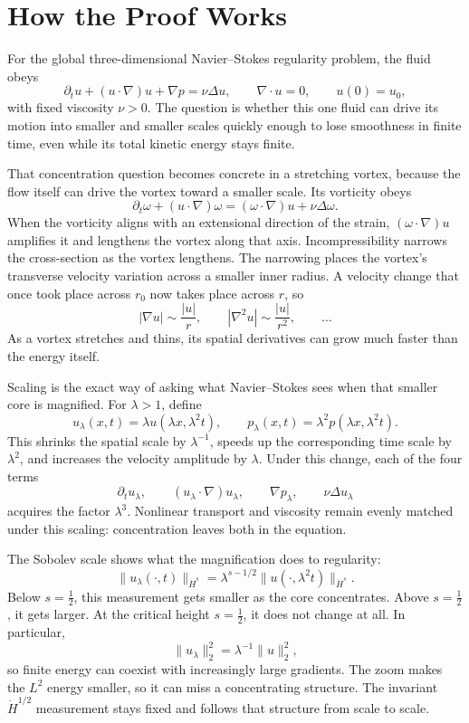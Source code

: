 \documentclass[11pt]{article}
\begin{document}
\section*{How the Proof Works}

For the global three-dimensional Navier--Stokes regularity problem, the fluid obeys
\[
\partial_tu+(u\cdot\nabla)u+\nabla p=\nu\Delta u,
\qquad \nabla\cdot u=0,
\qquad u(0)=u_0,
\]
with fixed viscosity \(\nu>0\).  The question is whether this one fluid can drive its motion into smaller and smaller scales quickly enough to lose smoothness in finite time, even while its total kinetic energy stays finite.

That concentration question becomes concrete in a stretching vortex, because the flow itself can drive the vortex toward a smaller scale.  Its vorticity obeys
\[
\partial_t\omega+(u\cdot\nabla)\omega
=(\omega\cdot\nabla)u+\nu\Delta\omega.
\]
When the vorticity aligns with an extensional direction of the strain, \((\omega\cdot\nabla)u\) amplifies it and lengthens the vortex along that axis.  Incompressibility narrows the cross-section as the vortex lengthens.  The narrowing places the vortex's transverse velocity variation across a smaller inner radius.  A velocity change that once took place across \(r_0\) now takes place across \(r\), so
\[
|\nabla u|\sim \frac{|u|}{r},
\qquad
|\nabla^2u|\sim \frac{|u|}{r^2},
\qquad \ldots
\]
As a vortex stretches and thins, its spatial derivatives can grow much faster than the energy itself.

Scaling is the exact way of asking what Navier--Stokes sees when that smaller core is magnified.  For \(\lambda>1\), define
\[
u_\lambda(x,t)=\lambda u(\lambda x,\lambda^2t),
\qquad
p_\lambda(x,t)=\lambda^2p(\lambda x,\lambda^2t).
\]
This shrinks the spatial scale by \(\lambda^{-1}\), speeds up the corresponding time scale by \(\lambda^2\), and increases the velocity amplitude by \(\lambda\).  Under this change, each of the four terms
\[
\partial_tu_\lambda,\qquad
(u_\lambda\cdot\nabla)u_\lambda,\qquad
\nabla p_\lambda,\qquad
\nu\Delta u_\lambda
\]
acquires the factor \(\lambda^3\).  Nonlinear transport and viscosity remain evenly matched under this scaling: concentration leaves both in the equation.

The Sobolev scale shows what the magnification does to regularity:
\[
\|u_\lambda(\cdot,t)\|_{\dot H^s}
=\lambda^{s-1/2}
\|u(\cdot,\lambda^2t)\|_{\dot H^s}.
\]
Below \(s=\tfrac12\), this measurement gets smaller as the core concentrates.  Above \(s=\tfrac12\), it gets larger.  At the critical height \(s=\tfrac12\), it does not change at all.  In particular,
\[
\|u_\lambda\|_2^2=\lambda^{-1}\|u\|_2^2,
\]
so finite energy can coexist with increasingly large gradients.  The zoom makes the \(L^2\) energy smaller, so it can miss a concentrating structure.  The invariant \(\dot H^{1/2}\) measurement stays fixed and follows that structure from scale to scale.
\end{document}
